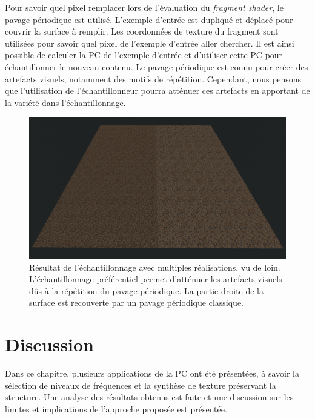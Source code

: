 Pour savoir quel pixel remplacer lors de l'évaluation du \textit{fragment shader}, le pavage périodique est utilisé. L'exemple d'entrée est dupliqué et déplacé pour couvrir la surface à remplir. Les coordonnées de texture du fragment sont utilisées pour savoir quel pixel de l'exemple d'entrée aller chercher. Il est ainsi possible de calculer la PC de l'exemple d'entrée et d'utiliser cette PC pour échantillonner le nouveau contenu. Le pavage périodique est connu pour créer des artefacts visuels, notamment des motifs de répétition. Cependant, nous pensons que l'utilisation de l'échantillonneur pourra atténuer ces artefacts en apportant de la variété dans l'échantillonnage.

\begin{figure}[t]
    \centering
    \includegraphics[width=\textwidth]{contenu/resources/images/partitioned_sampling_pc_preserving_shuffle_uv_far}
    \caption[Résultat de l'échantillonnage avec multiples réalisations, vu de loin]{Résultat de l'échantillonnage avec multiples réalisations, vu de loin. L'échantillonnage préférentiel permet d'atténuer les artefacts visuels dûs à la répétition du pavage périodique. La partie droite de la surface est recouverte par un pavage périodique classique.}
    \label{fig:pc-preserving-synthesis}
\end{figure}

\section{Discussion}

Dans ce chapitre, plusieurs applications de la PC ont été présentées, à savoir la sélection de niveaux de fréquences et la synthèse de texture préservant la structure. Une analyse des résultats obtenus est faite et une discussion sur les limites et implications de l'approche proposée est présentée.

